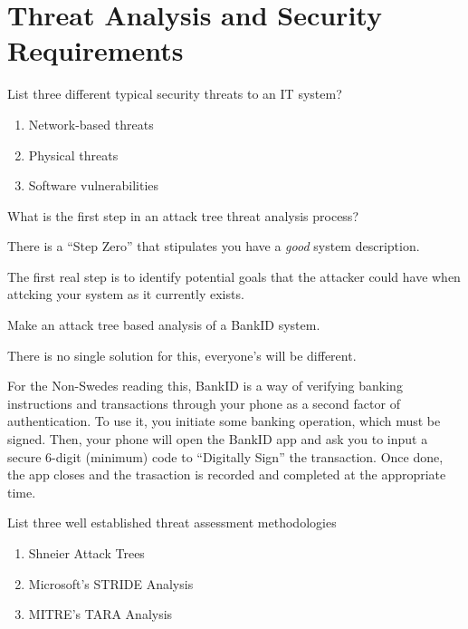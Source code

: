 \section{Threat Analysis and Security Requirements}\label{sec:Threat_Analysis-Security_Requirements}
\begin{questions}
\question{} List three different typical security threats to an IT system?
  \begin{solution}
    \begin{enumerate}[noitemsep]
    \item Network-based threats
    \item Physical threats
    \item Software vulnerabilities
    \end{enumerate}
  \end{solution}

\question{} What is the first step in an attack tree threat analysis process?
  \begin{solution}
    There is a ``Step Zero'' that stipulates you have a \emph{good} system description.

    The first real step is to identify potential goals that the attacker could have when attcking your system as it currently exists.
  \end{solution}

\question{} Make an attack tree based analysis of a BankID system.
  \begin{solution}
    There is no single solution for this, everyone's will be different.

    For the Non-Swedes reading this, BankID is a way of verifying banking instructions and transactions through your phone as a second factor of authentication.
    To use it, you initiate some banking operation, which must be signed.
    Then, your phone will open the BankID app and ask you to input a secure 6-digit (minimum) code to ``Digitally Sign'' the transaction.
    Once done, the app closes and the trasaction is recorded and completed at the appropriate time.
  \end{solution}

\question{} List three well established threat assessment methodologies
  \begin{solution}
    \begin{enumerate}[noitemsep]
    \item Shneier Attack Trees
    \item Microsoft's STRIDE Analysis
    \item MITRE's TARA Analysis
    \end{enumerate}
  \end{solution}


\end{questions}
